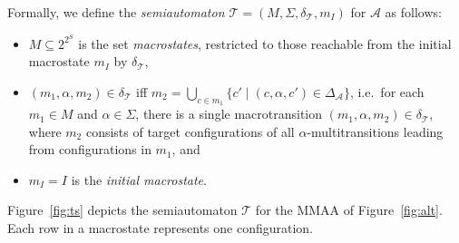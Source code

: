 \documentclass{llncs}
\newcommand{\mA}{\mathcal{A}}
\newcommand{\mT}{\mathcal{T}}
\newcommand{\A}{_{\mA}}			\newcommand{\T}{_{\mT}}
\begin{document}
Formally, we define the \emph{semiautomaton $\mT = (M,\Sigma,\delta\T,m_{I})$} 
for $\mA$ as follows:
\begin{itemize}
\item $M \subseteq 2^{2^{S}}$ is the set \emph{macrostates}, restricted to
  those reachable from the initial macrostate $m_I$ by $\delta\T$,
\item $(m_1,\alpha,m_2) \in \delta\T$ iff $m_2 = \bigcup_{c\in m_1} \{c'
  \mid (c, \alpha, c') \in \Delta\A \}$, i.e.~for each $m_1\in M$ and
  $\alpha\in\Sigma$, there is a single macrotransition
  $(m_1,\alpha,m_2)\in\delta\T$, where $m_2$ consists of target
  configurations of all $\alpha$-multitransitions leading from
  configurations in $m_1$, and
\item $m_{I}= I$ is the \emph{initial macrostate}.
\end{itemize}




Figure~\ref{fig:ts} depicts the semiautomaton $\mT$ for the MMAA of
Figure~\ref{fig:alt}. Each row in a macrostate represents one configuration.























		  


    
















		  


    
\end{document}

